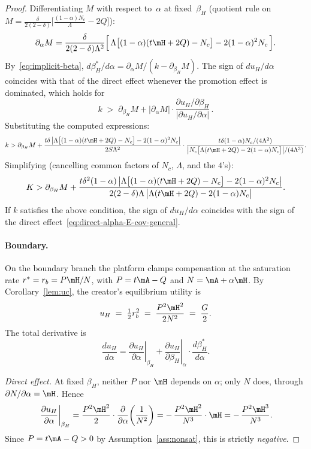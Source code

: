 \begin{proof}
Differentiating $M$ with respect to~$\alpha$ at fixed~$\beta_H$ (quotient rule on $M = \tfrac{\delta}{2(2-\delta)}\bigl[\tfrac{(1-\alpha)N_c}{\Lambda} - 2Q\bigr]$):
\begin{equation}\label{eq:dPhi-dalpha-E-cov}
\partial_\alpha M
= \frac{\delta}{2(2-\delta)\Lambda^2}\Bigl[\,\Lambda\bigl[(1-\alpha)(t\mH+2Q) - N_c\bigr] - 2(1-\alpha)^2 N_c\,\Bigr].
\end{equation}
By~\eqref{eq:implicit-beta}, $d\beta_H^*/d\alpha = \partial_\alpha M/(k -\partial_{\beta_H}M)$.  The sign of $du_H/d\alpha$ coincides with that of the direct effect whenever the promotion effect is dominated, which holds for
\[
k \;>\; \partial_{\beta_H}M
+ \bigl|\partial_\alpha M\bigr|\cdot
\frac{\partial u_H/\partial\beta_H}{\bigl|\partial u_H/\partial\alpha\bigr|}\,.
\]
Substituting the computed expressions:
\[
k> \partial_{\beta_H}M
+ \frac{t\delta\,\bigl|\Lambda\bigl[(1-\alpha)(t\mH+2Q) - N_c\bigr] - 2(1-\alpha)^2 N_c\bigr|}{2S\Lambda^2}
\cdot\frac{t\delta(1-\alpha)N_c/(4\Lambda^2)}{\bigl|N_c\bigl[\Lambda(t\mH + 2Q) - 2(1-\alpha)N_c\bigr]\bigr|/(4\Lambda^3)}.
\]
Simplifying (cancelling common factors of $N_c$, $\Lambda$, and the $4$'s):
\begin{equation}\label{eq:kbar-alpha-uc-E-cov-clean}
K> \partial_{\beta_H}M
+ \frac{t\delta^2(1-\alpha)\,\bigl|\Lambda\bigl[(1-\alpha)(t\mH+2Q) - N_c\bigr] - 2(1-\alpha)^2 N_c\bigr|}{2(2-\delta)\Lambda\,\bigl|\Lambda(t\mH + 2Q) - 2(1-\alpha)N_c\bigr|}.
\end{equation}
If $k$ satisfies the above condition, the sign of $du_H/d\alpha$ coincides with the sign of the direct effect~\eqref{eq:direct-alpha-E-cov-general}.


\paragraph{Boundary.}
On the boundary branch the platform clamps compensation at the saturation
rate $r^* = r_b = P\mH/N$, with $P = t\mA - Q$ and $N = \mA + \alpha\mH$.
By Corollary~\ref{lem:uc}, the creator's equilibrium utility is
\[
u_H \;=\; \tfrac{1}{2}r_b^2 \;=\; \frac{P^2\mH^2}{2N^2} \;=\; \frac{G}{2}.
\]
The total derivative is
\[
\frac{du_H}{d\alpha}
= \left.\frac{\partial u_H}{\partial\alpha}\right|_{\beta_H}
+ \left.\frac{\partial u_H}{\partial\beta_H}\right|_{\alpha}\cdot\frac{d\beta_H^*}{d\alpha}.
\]

\textit{Direct effect.}\; At fixed $\beta_H$, neither $P$ nor $\mH$ depends on
$\alpha$; only $N$ does, through $\partial N/\partial\alpha = \mH$. Hence
\begin{equation}\label{eq:duc-direct-E-bnd}
\left.\frac{\partial u_H}{\partial\alpha}\right|_{\beta_H}
= \frac{P^2\mH^2}{2}\cdot\frac{\partial}{\partial\alpha}\!\left(\frac{1}{N^2}\right)
= -\,\frac{P^2\mH^2}{N^3}\cdot\mH
= -\,\frac{P^2\mH^3}{N^3}.
\end{equation}
Since $P = t\mA - Q > 0$ by Assumption~\ref{ass:nonsat}, this is strictly
\emph{negative}.


\end{proof}
